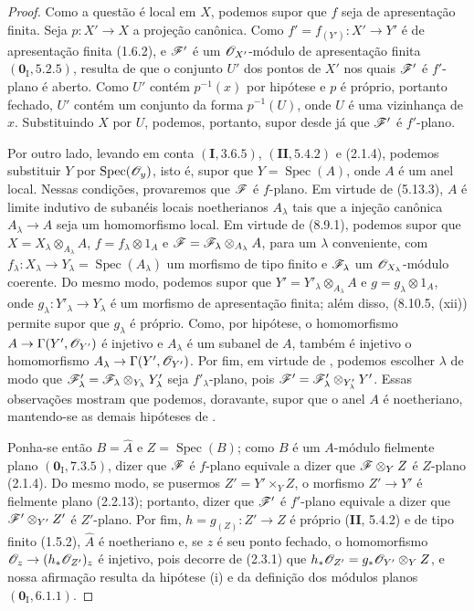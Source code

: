 \begin{proof}
Como a questão é local
em $X$, podemos supor
que $f$ seja de
apresentação finita.
Seja $p:X'\to X$ a
projeção canônica. Como
$f'=f_{(Y')}:X'\to Y'$
é de apresentação finita
(1.6.2), e $\mathscr{F}'$ é um
$\mathscr{O}_{X'}$-módulo de
apresentação finita
$(\mathbf{0}_{\mathrm I},
5.2.5)$, resulta de
 que o
conjunto $U'$ dos pontos
de $X'$ nos quais
$\mathscr{F}'$ é $f'$-plano
é aberto. Como $U'$ contém
$p^{-1}(x)$ por hipótese
e $p$ é próprio, portanto
fechado, $U'$ contém um
conjunto da forma
$p^{-1}(U)$, onde $U$ é
uma vizinhança de $x$.
Substituindo $X$ por $U$,
podemos, portanto, supor
desde já que $\mathscr{F}'$
é $f'$-plano.

Por outro lado, levando em
conta $(\mathbf I,3.6.5)$,
$(\mathbf{II},5.4.2)$ e
(2.1.4), podemos substituir
$Y$ por
$\operatorname{Spec}(\mathscr{O}_y)$,
isto é, supor que
$Y=\operatorname{Spec}(A)$,
onde $A$ é um anel local.
Nessas condições, provaremos
que $\mathscr{F}$ é $f$-plano.
Em virtude de (5.13.3),
$A$ é limite indutivo de
subanéis locais noetherianos
$A_\lambda$ tais que a
injeção canônica
$A_\lambda\to A$ seja um
homomorfismo local. Em
virtude de (8.9.1), podemos
supor que
$X=X_\lambda\otimes_{A_\lambda}A$,
$f=f_\lambda\otimes1_A$ e
$\mathscr{F}=\mathscr{F}_\lambda
\otimes_{A_\lambda}A$,
para um $\lambda$ conveniente,
com
$f_\lambda:X_\lambda\to
Y_\lambda=
\operatorname{Spec}(A_\lambda)$
um morfismo de tipo finito
e $\mathscr{F}_\lambda$ um
$\mathscr{O}_{X_\lambda}$-módulo
coerente. Do mesmo modo,
podemos supor que
$Y'=Y'_\lambda
\otimes_{A_\lambda}A$ e
$g=g_\lambda\otimes1_A$,
onde $g_\lambda:Y'_\lambda
\to Y_\lambda$ é um
morfismo de apresentação
finita; além disso,
(8.10.5, (xii)) permite
supor que $g_\lambda$ é
próprio. Como, por hipótese,
o homomorfismo
$A\to\Gamma(Y',\sh{O}_{Y'})$
é injetivo e $A_\lambda$
é um subanel de $A$,
também é injetivo o
homomorfismo
$A_\lambda\to
\Gamma(Y',\sh{O}_{Y'})$.
Por fim, em virtude de
, podemos
escolher $\lambda$ de modo
que $\mathscr{F}'_\lambda=
\mathscr{F}_\lambda\otimes_{Y_\lambda}
Y'_\lambda$ seja
$f'_\lambda$-plano, pois
$\mathscr{F}'=\mathscr{F}'_\lambda
\otimes_{Y'_\lambda}Y'$.
Essas observações mostram
que podemos, doravante,
supor que o anel $A$ é
noetheriano, mantendo-se
as demais hipóteses de
.

Ponha-se então
$B=\widehat A$ e
$Z=\operatorname{Spec}(B)$;
como $B$ é um $A$-módulo
fielmente plano
$(\mathbf{0}_{\mathrm I},
7.3.5)$, dizer que
$\mathscr{F}$ é $f$-plano
equivale a dizer que
$\mathscr{F}\otimes_Y Z$ é
$Z$-plano (2.1.4).
Do mesmo modo, se pusermos
$Z'=Y'\times_Y Z$, o
morfismo $Z'\to Y'$ é
fielmente plano (2.2.13);
portanto, dizer que
$\mathscr{F}'$ é $f'$-plano
equivale a dizer que
$\mathscr{F}'\otimes_{Y'}Z'$
é $Z'$-plano. Por fim,
$h=g_{(Z)}:Z'\to Z$ é
próprio (\textbf{II},
5.4.2) e de tipo finito
(1.5.2), $\widehat A$ é
noetheriano e, se $z$ é
seu ponto
fechado, o homomorfismo
$\sh{O}_z\to
(h_*\sh{O}_{Z'})_z$
é injetivo, pois decorre
de (2.3.1) que
$h_*\mathscr{O}_{Z'}=
g_*\mathscr{O}_{Y'}\otimes_Y Z$,
e nossa afirmação resulta
da hipótese (i) e da
definição dos módulos planos
$(\mathbf{0}_{\mathrm I},
6.1.1)$.


\end{proof}
